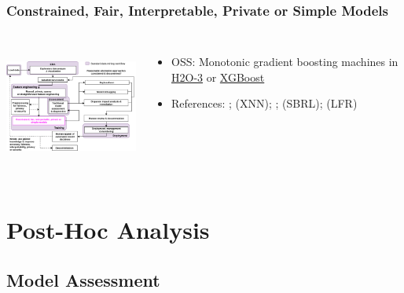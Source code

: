 \documentclass[11pt,
               aspectratio=169,
               hyperref={colorlinks}
               ]{beamer}
\begin{document}
			\begin{frame}
		
				\frametitle{Constrained, Fair, Interpretable, Private or Simple Models}		
			
				\begin{columns}
	
					\centering
					\includegraphics[height=120pt]{img/im.png}
				
					\vspace{-5pt}
					\small
					\begin{itemize}
						\item OSS: Monotonic gradient boosting machines in \href{https://github.com/h2oai/h2o-3/blob/master/h2o-py/demos/H2O_tutorial_gbm_monotonicity.ipynb}{H2O-3} or \href{https://xiaoxiaowang87.github.io/monotonicity_constraint/}{XGBoost}
						\item References: ;  (XNN); ;  (SBRL);  (LFR)	
					\end{itemize}
					\normalsize
				
				\end{columns}			
			
			\end{frame}

	\section{Post-Hoc Analysis}

		\subsection{Model Assessment}
\end{document}
